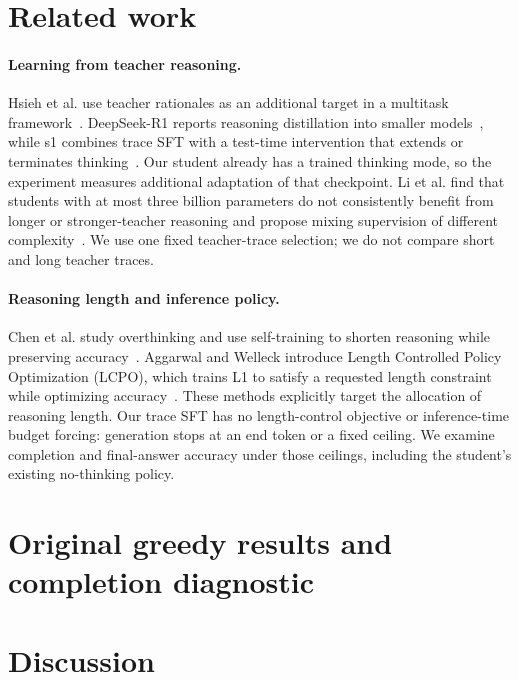 \documentclass[11pt]{article}
\begin{document}
\section{Related work}
\paragraph{Learning from teacher reasoning.}
Hsieh et al. use teacher rationales as an additional target in a multitask framework~\cite{stepwise}. DeepSeek-R1 reports reasoning distillation into smaller models~\cite{r1}, while s1 combines trace SFT with a test-time intervention that extends or terminates thinking~\cite{simple}. Our student already has a trained thinking mode, so the experiment measures additional adaptation of that checkpoint. Li et al. find that students with at most three billion parameters do not consistently benefit from longer or stronger-teacher reasoning and propose mixing supervision of different complexity~\cite{small}. We use one fixed teacher-trace selection; we do not compare short and long teacher traces.

\paragraph{Reasoning length and inference policy.}
Chen et al. study overthinking and use self-training to shorten reasoning while preserving accuracy~\cite{overthinking}. Aggarwal and Welleck introduce Length Controlled Policy Optimization (LCPO), which trains L1 to satisfy a requested length constraint while optimizing accuracy~\cite{l1}. These methods explicitly target the allocation of reasoning length. Our trace SFT has no length-control objective or inference-time budget forcing: generation stops at an end token or a fixed ceiling. We examine completion and final-answer accuracy under those ceilings, including the student's existing no-thinking policy.




\FloatBarrier

\section{Original greedy results and completion diagnostic}
\label{sec:original}


\FloatBarrier

\section{Discussion}

\end{document}
